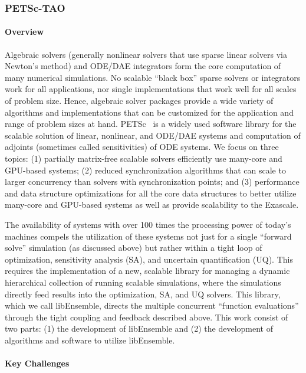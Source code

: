\subsubsection{ PETSc-TAO} \label{subsubsect:petsc}
\paragraph{Overview} 

Algebraic solvers (generally nonlinear solvers that use sparse linear solvers via Newton's method) and ODE/DAE 
integrators form the core computation of many numerical simulations. No scalable ``black box'' sparse solvers 
or integrators work for all applications, nor single implementations that work well for all scales of 
problem size. Hence, algebraic solver packages provide a wide variety of algorithms and implementations 
that can be customized for the application and range of problem sizes at hand. PETSc~\cite{petsc:homepage,petsc-man} 
is a widely used software library for the scalable solution of linear, nonlinear, and ODE/DAE systems and 
computation of adjoints (sometimes called sensitivities) of ODE systems. We focus on three topics: (1) partially 
matrix-free scalable solvers efficiently use many-core and GPU-based systems; (2) reduced synchronization 
algorithms that can scale to larger concurrency than solvers with synchronization points; and (3) performance 
and data structure optimizations for all the core data structures to better utilize many-core and GPU-based 
systems as well as provide scalability to the Exascale.

The availability of systems with over 100 times the processing power of today's machines compels the utilization 
of these systems not just for a single ``forward solve'' simulation (as discussed above) but rather within a 
tight loop of optimization, sensitivity analysis (SA), and uncertain quantification (UQ). This requires the 
implementation of a new, scalable library for managing a dynamic hierarchical collection of running scalable 
simulations, where the simulations directly feed results into the optimization, SA, and UQ solvers.  This library, 
which we call libEnsemble, directs the multiple concurrent ``function evaluations'' through the tight coupling 
and feedback described above. This work consist of two parts: (1) the development of libEnsemble and (2) the 
development of algorithms and software to utilize libEnsemble.

\paragraph{Key Challenges}

